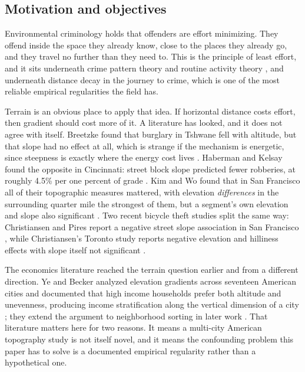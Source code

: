 \documentclass[12pt,letterpaper]{article}
\begin{document}
\subsection{Motivation and objectives}

Environmental criminology holds that offenders are effort minimizing. They offend
inside the space they already know, close to the places they already go, and they
travel no further than they need to. This is the principle of least effort, and it
sits underneath crime pattern theory \citep{brantingham1993} and routine activity
theory \citep{cohen1979}, and underneath distance decay in the journey to crime,
which is one of the most reliable empirical regularities the field has.

Terrain is an obvious place to apply that idea. If horizontal distance costs effort,
then gradient should cost more of it. A literature has looked, and it does not agree
with itself. Breetzke found that burglary in Tshwane fell with altitude, but that
slope had no effect at all, which is strange if the mechanism is energetic, since
steepness is exactly where the energy cost lives \citep{breetzke2012}. Haberman and
Kelsay found the opposite in Cincinnati: street block slope predicted fewer
robberies, at roughly 4.5\% per one percent of grade \citep{haberman2021}. Kim and Wo
found that in San Francisco all of their topographic measures mattered, with
elevation \emph{differences} in the surrounding quarter mile the strongest of them,
but a segment's own elevation and slope also significant \citep{kimwo2023}. Two
recent bicycle theft studies split the same way: Christiansen and Pires report a
negative street slope association in San Francisco \citep{bikesf2026}, while
Christiansen's Toronto study reports negative elevation and hilliness effects with
slope itself not significant \citep{biketoronto2026}.

The economics literature reached the terrain question earlier and from a different
direction. Ye and Becker analyzed elevation gradients across seventeen American
cities and documented that high income households prefer both altitude and
unevenness, producing income stratification along the vertical dimension of a city
\citep{yebecker2018}; they extend the argument to neighborhood sorting in later work
\citep{yebecker2024}. That literature matters here for two reasons. It means a
multi-city American topography study is not itself novel, and it means the
confounding problem this paper has to solve is a documented empirical regularity
rather than a hypothetical one.
\end{document}
